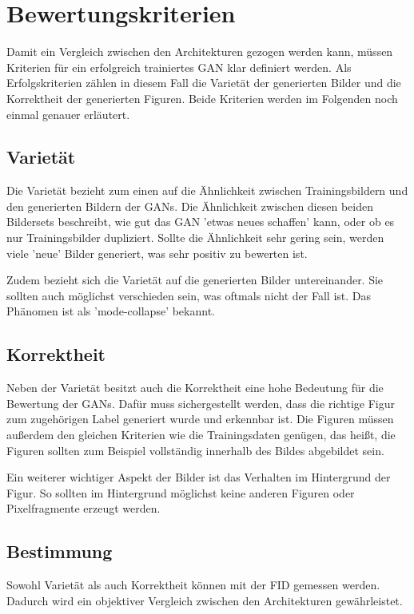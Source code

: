 \section{Bewertungskriterien}
Damit ein Vergleich zwischen den Architekturen gezogen werden kann, müssen Kriterien für ein erfolgreich trainiertes GAN klar definiert werden.
Als Erfolgskriterien zählen in diesem Fall die Varietät der generierten Bilder und die Korrektheit der generierten Figuren.
Beide Kriterien werden im Folgenden noch einmal genauer erläutert.

\subsection{Varietät}
Die Varietät bezieht zum einen auf die Ähnlichkeit zwischen Trainingsbildern und den generierten Bildern der GANs.
Die Ähnlichkeit zwischen diesen beiden Bildersets beschreibt, wie gut das GAN 'etwas neues schaffen' kann, oder ob es nur Trainingsbilder dupliziert.
Sollte die Ähnlichkeit sehr gering sein, werden viele 'neue' Bilder generiert, was sehr positiv zu bewerten ist.
\newline

Zudem bezieht sich die Varietät auf die generierten Bilder untereinander.
Sie sollten auch möglichst verschieden sein, was oftmals nicht der Fall ist.
Das Phänomen ist als 'mode-collapse' bekannt. 

\subsection{Korrektheit}
Neben der Varietät besitzt auch die Korrektheit eine hohe Bedeutung für die Bewertung der GANs.
Dafür muss sichergestellt werden, dass die richtige Figur zum zugehörigen Label generiert wurde und erkennbar ist.
Die Figuren müssen außerdem den gleichen Kriterien wie die Trainingsdaten genügen, das heißt, die Figuren sollten zum Beispiel vollständig innerhalb des Bildes abgebildet sein.
\newline

Ein weiterer wichtiger Aspekt der Bilder ist das Verhalten im Hintergrund der Figur.
So sollten im Hintergrund möglichst keine anderen Figuren oder Pixelfragmente erzeugt werden.

\subsection{Bestimmung}
Sowohl Varietät als auch Korrektheit können mit der \acrlong{FID} \cite{frechet-inception-distance} gemessen werden.
Dadurch wird ein objektiver Vergleich zwischen den Architekturen gewährleistet.
\newline

